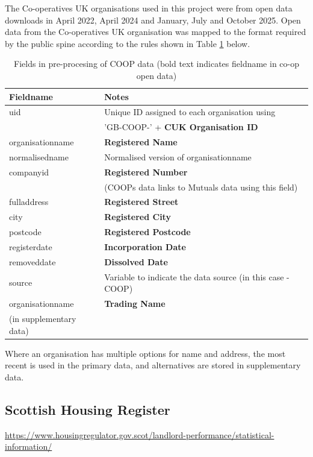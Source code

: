 \documentclass{article}
\begin{document}
The Co-operatives UK organisations used in this project were from open data downloads in April 2022, April 2024 and 
January, July and October 2025.
Open data from the Co-operatives UK organisation was mapped to the format required by the public spine
according to the rules shown in Table \ref{tab:coop_preprocess} below.

\begin{table}[h]
  \centering
  \begin{tabularx}{\textwidth}{|l|X|}
    \hline
    Fieldname  &	Notes \\
    \hline \hline
uid & Unique ID assigned to each organisation using \\
&'GB-COOP-' + \textbf{CUK Organisation ID} \\ \hline
organisationname & \textbf{Registered Name} \\ \hline
normalisedname & Normalised version of organisationname\\ \hline
companyid & \textbf{Registered Number} \\
&(COOPs data links to Mutuals data using this field) \\ \hline
fulladdress & \textbf{Registered Street} \\ \hline
city & \textbf{Registered City} \\ \hline
postcode & \textbf{Registered Postcode} \\ \hline
registerdate & \textbf{Incorporation Date} \\ \hline
removeddate & \textbf{Dissolved Date} \\ \hline
source & Variable to indicate the data source (in this case - COOP) \\ \hline
\hline \hline
organisationname & \textbf{Trading Name} \\
(in supplementary data) & \\ \hline
\end{tabularx}
  \caption{Fields in pre-procesing of COOP data (bold text indicates fieldname in co-op open data)}
  \label{tab:coop_preprocess}
  
\end{table}

Where an organisation has multiple options for name and address, the most recent
is used in the primary data, and alternatives are stored in supplementary data.




\clearpage
\subsection{Scottish Housing Register }
\url{https://www.housingregulator.gov.scot/landlord-performance/statistical-information/}
\end{document}
